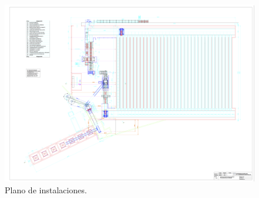 \newpage

\begin{figure}[!htb]
\centering
\includegraphics[angle=90,width=13.5cm]{plano_nave.png}
\caption{Plano de instalaciones.}
\label{fig:planonave}
\end{figure}

